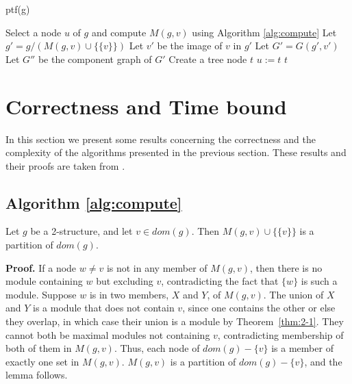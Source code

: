 \begin{algorithm}[H]
    \caption{ptf(g)}
    \label{alg:ptf}
    Select a node $u$ of $g$ and compute $M(g, v)$ using Algorithm \ref{alg:compute}\;
    Let $g' = g / (M(g, v) \cup \{\{v\}\})$\;
    Let $v'$ be the image of $v$ in $g'$\;
    Let $G' = G(g', v')$\;
    Let $G''$ be the component graph of $G'$\;
    Create a tree node $t$\;
    $u := t$\;
    \Return $t$\;
\end{algorithm}


\section{Correctness and Time bound}\label{sec:correctness-and-time-bound}

In this section we present some results concerning the correctness and the complexity of the algorithms presented in the previous section.
These results and their proofs are taken from \cite{PTDMD}.

\subsection{Algorithm \ref{alg:compute}}\label{subsec:algorithm-compute}

\begin{mylem}
    \label{lem:lemma-4-1}
    Let $g$ be a 2-structure, and let $v \in dom(g)$.
    Then $M(g, v) \cup \{\{v\}\}$ is a partition of $dom(g)$.
\end{mylem}

\textbf{Proof.}
If a node $w \neq v$ is not in any member of $M(g, v)$, then there is no module containing $w$ but excluding $v$, contradicting the fact that $\{w\}$ is such a module.
Suppose $w$ is in two members, $X$ and $Y$, of $M(g, v)$.
The union of $X$ and $Y$ is a module that does not contain $v$, since one contains the other or else they overlap, in which case their union is a module by Theorem~\ref{thm:2-1}.
They cannot both be maximal modules not containing $v$, contradicting membership of both of them in $M(g, v)$.
Thus, each node of $dom(g) - \{v\}$ is a member of exactly one set in $M(g, v)$.
$M(g, v)$ is a partition of $dom(g) - \{v\}$, and the lemma follows.


